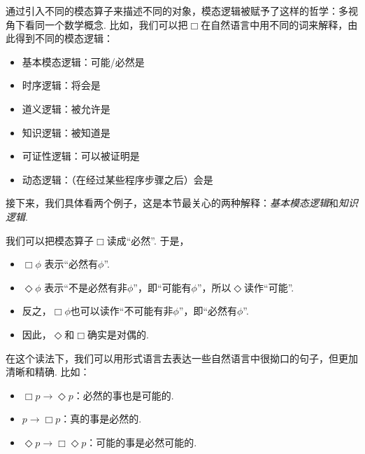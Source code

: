 通过引入不同的模态算子来描述不同的对象，模态逻辑被赋予了这样的哲学：多视角下看同一个数学概念. 比如，我们可以把$\Box$在自然语言中用不同的词来解释，由此得到不同的模态逻辑：
\begin{itemize}
    \item 基本模态逻辑：可能/必然是
    \item 时序逻辑：将会是
    \item 道义逻辑：被允许是
    \item 知识逻辑：被知道是
    \item 可证性逻辑：可以被证明是
    \item 动态逻辑：（在经过某些程序步骤之后）会是
\end{itemize}

接下来，我们具体看两个例子，这是本节最关心的两种解释：\textit{基本模态逻辑}和\textit{知识逻辑}. 
\begin{example}[基本模态逻辑]
我们可以把模态算子$\Box$读成“必然”. 于是，
\begin{itemize}
    \item $\Box\phi$ 表示“必然有$\phi$”. 
    \item $\Diamond\phi$ 表示“不是必然有非$\phi$”，即“可能有$\phi$”，所以$\Diamond$读作“可能”. 
    \item 反之，$\Box\phi$也可以读作“不可能有非$\phi$”，即“必然有$\phi$”. 
    \item 因此，$\Diamond$和$\Box$确实是对偶的. 
\end{itemize}

在这个读法下，我们可以用形式语言去表达一些自然语言中很拗口的句子，但更加清晰和精确. 比如：
\begin{itemize}
    \item $\Box p\to\Diamond p$：必然的事也是可能的. 
    \item $p\to\Box p$：真的事是必然的. 
    \item $\Diamond p\to\Box\Diamond p$：可能的事是必然可能的. 
\end{itemize}
\end{example}

